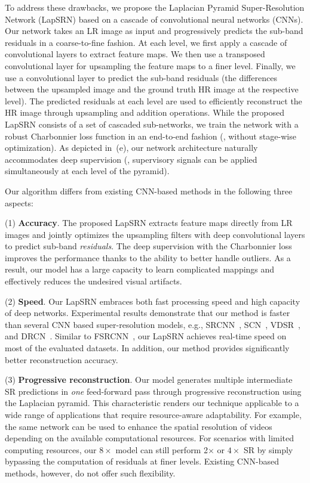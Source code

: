 \documentclass[10pt,twocolumn,letterpaper]{article}
\begin{document}
	To address these drawbacks, we propose the Laplacian Pyramid Super-Resolution Network (LapSRN) based on a cascade of convolutional neural networks (CNNs).
	Our network takes an LR image as input and progressively predicts the sub-band residuals in a coarse-to-fine fashion. 
	At each level, we first apply a cascade of convolutional layers to extract feature maps.
	We then use a transposed convolutional layer for upsampling the feature maps to a finer level.
	Finally, we use a convolutional layer to predict the sub-band residuals (the differences between the upsampled image and the ground truth HR image at the respective level).
	The predicted residuals at each level are used to efficiently reconstruct the HR image through upsampling and addition operations.
	While the proposed LapSRN consists of a set of cascaded sub-networks, we train the network with a robust Charbonnier loss function in an end-to-end fashion (\ie, without stage-wise optimization).
	As depicted in~(e), our network architecture naturally accommodates deep supervision (\ie, supervisory signals can be applied simultaneously at each level of the pyramid).
	
	
	Our algorithm differs from existing CNN-based methods in the following three aspects: 
	
	\noindent (1) \textbf{Accuracy}. 
	The proposed LapSRN extracts feature maps directly from LR images and jointly optimizes the upsampling filters with deep convolutional layers to predict sub-band \emph{residuals}.
	The deep supervision with the Charbonnier loss improves the performance thanks to the ability to better handle outliers.
	As a result, our model has a large capacity to learn complicated mappings and effectively reduces the undesired visual artifacts.
	
	\noindent (2) \textbf{Speed}.
	Our LapSRN embraces both fast processing speed and high capacity of deep networks.
	Experimental results demonstrate that our method is faster than several CNN based super-resolution models, e.g., SRCNN~\cite{SRCNN}, SCN~\cite{SCN}, VDSR~\cite{VDSR}, and DRCN~\cite{DRCN}.
	Similar to FSRCNN~\cite{FSRCNN}, our LapSRN achieves real-time speed on most of the evaluated datasets.
	In addition, our method provides significantly better reconstruction accuracy.
	
	\noindent (3) \textbf{Progressive reconstruction}. 
	Our model generates multiple intermediate SR predictions in \emph{one} feed-forward pass through progressive reconstruction using the Laplacian pyramid. 
	This characteristic renders our technique applicable to a wide range of applications that require resource-aware adaptability. 
	For example, the same network can be used to enhance the spatial resolution of videos depending on the available computational resources.
	For scenarios with limited computing resources, 
	our $8\times$ model can still perform 2$\times$ or $4\times$ SR by simply bypassing the computation of residuals at finer levels. 
	Existing CNN-based methods, however, do not offer such flexibility. 
	
\end{document}
